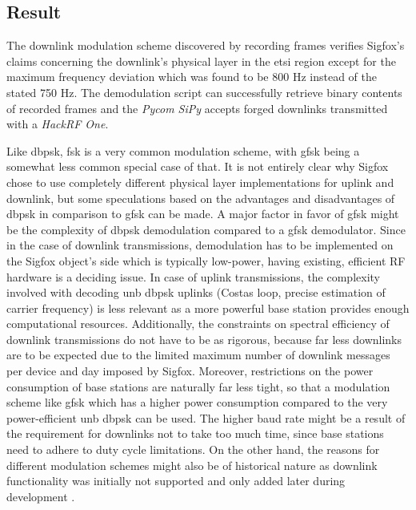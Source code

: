 \FloatBarrier
\subsection{Result}
The downlink modulation scheme discovered by recording frames verifies Sigfox's claims \cite[Section 5.2.1]{sigfox_ietf} concerning the downlink's physical layer in the \gls{etsi} region except for the maximum frequency deviation which was found to be 800 Hz instead of the stated 750 Hz.
The demodulation script can successfully retrieve binary contents of recorded frames and the \textit{Pycom SiPy} accepts forged downlinks transmitted with a \textit{HackRF One}.

Like \gls{dbpsk}, \gls{fsk} is a very common modulation scheme, with \gls{gfsk} being a somewhat less common special case of that.
It is not entirely clear why Sigfox chose to use completely different physical layer implementations for uplink and downlink, but some speculations based on the advantages and disadvantages of \gls{dbpsk} in comparison to \gls{gfsk} can be made.
A major factor in favor of \gls{gfsk} might be the complexity of \gls{dbpsk} demodulation compared to a \gls{gfsk} demodulator.
Since in the case of downlink transmissions, demodulation has to be implemented on the Sigfox object's side which is typically low-power, having existing, efficient RF hardware is a deciding issue.
In case of uplink transmissions, the complexity involved with decoding \gls{unb} \gls{dbpsk} uplinks (Costas loop, precise estimation of carrier frequency) is less relevant as a more powerful base station provides enough computational resources.
Additionally, the constraints on spectral efficiency of downlink transmissions do not have to be as rigorous, because far less downlinks are to be expected due to the limited maximum number of downlink messages per device and day imposed by Sigfox.
Moreover, restrictions on the power consumption of base stations are naturally far less tight, so that a modulation scheme like \gls{gfsk} which has a higher power consumption compared to the very power-efficient \gls{unb} \gls{dbpsk} can be used.
The higher baud rate might be a result of the requirement for downlinks not to take too much time, since base stations need to adhere to duty cycle limitations.
On the other hand, the reasons for different modulation schemes might also be of historical nature as downlink functionality was initially not supported and only added later during development \cite[Section 2.1]{lpwan_comparison}.

